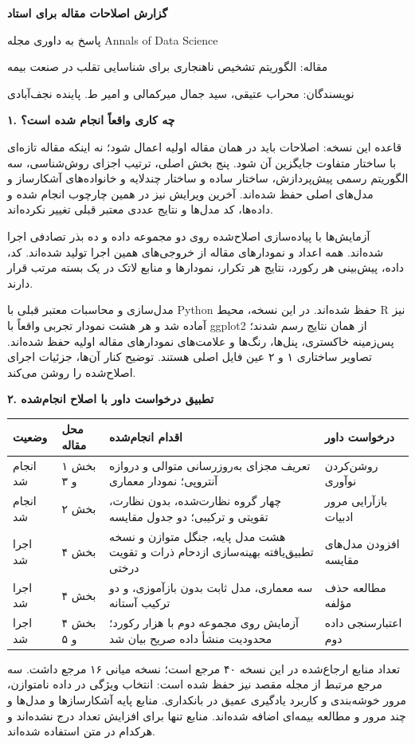 \documentclass[11pt,a4paper]{article}
\newcommand{\lr}[1]{{\latinfont\beginL#1\endL}}
\newcommand{\fa}[1]{\par\begingroup\raggedleft\noindent\beginR#1\endR\par\endgroup}
\newcommand{\fatitle}[1]{\fa{\large\bfseries #1}\medskip}
\newcommand{\cellfa}[1]{\raggedleft\arraybackslash\beginR#1\endR}
\begin{document}
\fa{\LARGE\bfseries گزارش اصلاحات مقاله برای استاد}
\fa{\large پاسخ به داوری مجله \lr{Annals of Data Science}}
\fa{مقاله: الگوریتم تشخیص ناهنجاری برای شناسایی تقلب در صنعت بیمه}
\fa{نویسندگان: محراب عتیقی، سید جمال میرکمالی و امیر ط. پاینده نجف‌آبادی}
\medskip
\fatitle{۱. چه کاری واقعاً انجام شده است؟}
\fa{قاعده این نسخه: اصلاحات باید در همان مقاله اولیه اعمال شود؛ نه اینکه مقاله تازه‌ای با ساختار متفاوت جایگزین آن شود. پنج بخش اصلی، ترتیب اجزای روش‌شناسی، سه الگوریتم رسمی پیش‌پردازش، ساختار ساده و ساختار چندلایه و خانواده‌های آشکارساز و مدل‌های اصلی حفظ شده‌اند. آخرین ویرایش نیز در همین چارچوب انجام شده و داده‌ها، کد مدل‌ها و نتایج عددی معتبر قبلی تغییر نکرده‌اند.}
\fa{آزمایش‌ها با پیاده‌سازی اصلاح‌شده روی دو مجموعه داده و ده بذر تصادفی اجرا شده‌اند. همه اعداد و نمودارهای مقاله از خروجی‌های همین اجرا تولید شده‌اند. کد، داده، پیش‌بینی هر رکورد، نتایج هر تکرار، نمودارها و منابع لاتک در یک بسته مرتب قرار دارند.}
\fa{مدل‌سازی و محاسبات معتبر قبلی با \lr{Python} حفظ شده‌اند. در این نسخه، محیط \lr{R} نیز آماده شد و هر هشت نمودار تجربی واقعاً با \lr{ggplot2} از همان نتایج رسم شدند؛ پس‌زمینه خاکستری، پنل‌ها، رنگ‌ها و علامت‌های نمودارهای مقاله اولیه حفظ شده‌اند. تصاویر ساختاری ۱ و ۲ عین فایل اصلی هستند. توضیح کنار آن‌ها، جزئیات اجرای اصلاح‌شده را روشن می‌کند.}

\fatitle{۲. تطبیق درخواست داور با اصلاح انجام‌شده}
\small
\begin{tabular}{p{1.7cm}p{2.0cm}p{6.0cm}p{3.7cm}}
\toprule
\cellfa{وضعیت} & \cellfa{محل مقاله} & \cellfa{اقدام انجام‌شده} & \cellfa{درخواست داور}\\\midrule
\cellfa{انجام شد} & \cellfa{بخش ۱ و ۳} & \cellfa{تعریف مجزای به‌روزرسانی متوالی و دروازه آنتروپی؛ نمودار معماری} & \cellfa{روشن‌کردن نوآوری}\\[5pt]
\cellfa{انجام شد} & \cellfa{بخش ۲} & \cellfa{چهار گروه نظارت‌شده، بدون نظارت، تقویتی و ترکیبی؛ دو جدول مقایسه} & \cellfa{بازآرایی مرور ادبیات}\\[5pt]
\cellfa{اجرا شد} & \cellfa{بخش ۴} & \cellfa{هشت مدل پایه، جنگل متوازن و نسخه تطبیق‌یافته بهینه‌سازی ازدحام ذرات و تقویت درختی} & \cellfa{افزودن مدل‌های مقایسه}\\[5pt]
\cellfa{اجرا شد} & \cellfa{بخش ۴} & \cellfa{سه معماری، مدل ثابت بدون بازآموزی، و دو ترکیب آستانه} & \cellfa{مطالعه حذف مؤلفه}\\[5pt]
\cellfa{اجرا شد} & \cellfa{بخش ۴ و ۵} & \cellfa{آزمایش روی مجموعه دوم با هزار رکورد؛ محدودیت منشأ داده صریح بیان شد} & \cellfa{اعتبارسنجی داده دوم}\\
\bottomrule
\end{tabular}
\normalsize
\fa{تعداد منابع ارجاع‌شده در این نسخه ۴۰ مرجع است؛ نسخه میانی ۱۶ مرجع داشت. سه مرجع مرتبط از مجله مقصد نیز حفظ شده است: انتخاب ویژگی در داده نامتوازن، مرور خوشه‌بندی و کاربرد یادگیری عمیق در بانکداری. منابع پایه آشکارسازها و مدل‌ها و چند مرور و مطالعه بیمه‌ای اضافه شده‌اند. منابع تنها برای افزایش تعداد درج نشده‌اند و هرکدام در متن استفاده شده‌اند.}
\end{document}
